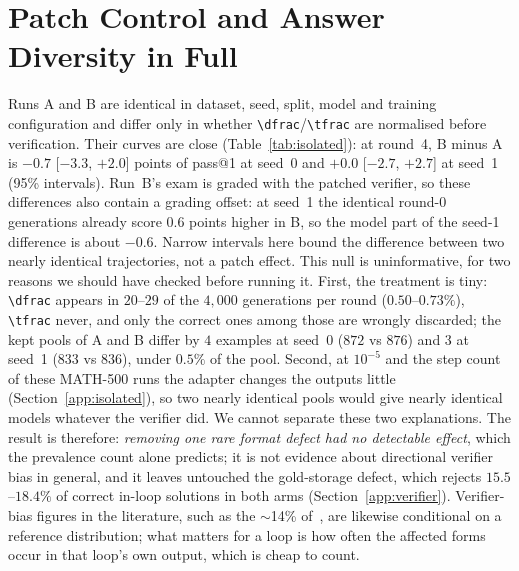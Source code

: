 \documentclass[runningheads]{llncs}
\begin{document}
\section{Patch Control and Answer Diversity in Full}
\label{app:control}

Runs A and B are identical in dataset, seed, split, model and training
configuration and differ only in whether \verb|\dfrac|/\verb|\tfrac| are
normalised before verification. Their curves are close
(Table~\ref{tab:isolated}): at round~4, B minus A is $-0.7$ [$-3.3$, $+2.0$] points of
pass@1 at seed~0 and $+0.0$ [$-2.7$, $+2.7$] at seed~1 (95\% intervals). Run~B's
exam is graded with the patched verifier, so these differences also contain a
grading offset: at seed~1 the identical round-0 generations already score
$0.6$ points higher in B, so the model part of the seed-1 difference is about
$-0.6$. Narrow intervals here bound the difference between two nearly identical
trajectories, not a patch effect. This null is uninformative, for two reasons
we should have checked before running it. First,
the treatment is tiny: \verb|\dfrac| appears in $20$--$29$ of the $4{,}000$
generations per round ($0.50$--$0.73\%$), \verb|\tfrac| never, and only the
correct ones among those are wrongly discarded; the kept pools of A and B differ
by $4$ examples at seed~0 ($872$ vs $876$) and $3$ at seed~1 ($833$ vs $836$),
under $0.5\%$ of the pool. Second, at $10^{-5}$ and the step count of these
MATH-500 runs the adapter changes the outputs little (Section~\ref{app:isolated}), so two nearly identical pools would give
nearly identical models whatever the verifier did. We cannot separate these
two explanations. The result is therefore: \emph{removing one rare format defect
had no detectable effect}, which the prevalence count alone predicts; it is not
evidence about directional verifier bias in general, and it leaves untouched the
gold-storage defect, which rejects $15.5$--$18.4\%$ of correct in-loop solutions
in both arms (Section~\ref{app:verifier}). Verifier-bias figures in
the literature, such as the $\sim$14\% of~\cite{ref_robustness}, are likewise
conditional on a reference distribution; what matters for a loop is how often
the affected forms occur in that loop's own output, which is cheap to count.
\end{document}
